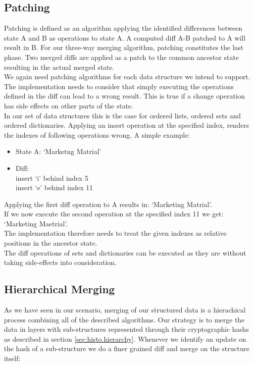 \subsection{Patching}
\label{sec:histo.merging.patching}

Patching is defined as an algorithm applying the identified differences between state A and B as operations to state A.
A computed diff A-B patched to A will result in B.
For our three-way merging algorithm, patching constitutes the last phase. 
Two merged diffs are applied as a patch to the common ancestor state resulting in the actual merged state.\\
We again need patching algorithms for each data structure we intend to support.
The implementation needs to consider that simply executing the operations defined in the diff can lead to a wrong result.
This is true if a change operation has side effects on other parts of the state.\\
In our set of data structures this is the case for ordered lists, ordered sets and ordered dictionaries.
Applying an insert operation at the specified index, renders the indexes of following operations wrong.
A simple example:

\begin{itemize}
\item State A: `Marketng Matrial'
\item Diff:\\
insert `i' behind index 5\\
insert `e' behind index 11
\end{itemize}

Applying the first diff operation to A results in: `Marketing Matrial'.\\
If we now execute the second operation at the specified index 11 we get: `Marketing Maetrial'.\\
The implementation therefore needs to treat the given indexes as relative positions in the ancestor state.\\
The diff operations of sets and dictionaries can be executed as they are without taking side-effects into consideration.

\subsection{Hierarchical Merging}
As we have seen in our scenario, merging of our structured data is a hierachical process combining all of the described algorithms.
Our strategy is to merge the data in layers with sub-structures represented through their cryptographic hashs as described in section \ref{sec:histo.hierarchy}.
Whenever we identify an update on the hash of a sub-structure we do a finer grained diff and merge on the structure itself:

